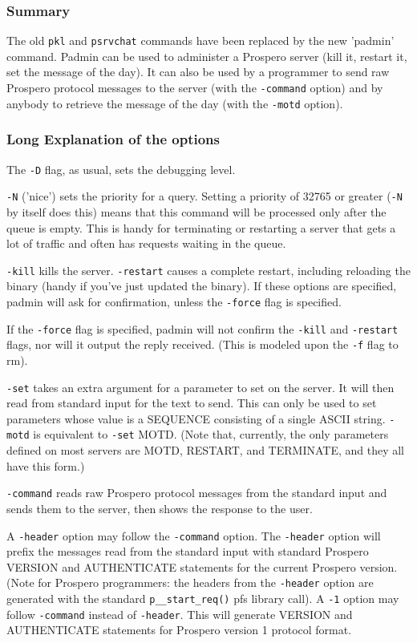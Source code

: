 \subsubsection*{Summary}

The old {\tt pkl} and {\tt psrvchat} commands have been replaced by the new
'padmin' command.  Padmin can be used to administer a Prospero server
(kill it, restart it, set the message of the day).  It can also be
used by a programmer to send raw Prospero protocol messages to the
server (with the {\tt -command} option) and by anybody to retrieve the
message of the day (with the {\tt -motd} option).

\subsubsection*{Long Explanation of the options}

The {\tt -D} flag, as usual, sets the debugging level.

{\tt -N} ('nice') sets the priority for a query.  Setting a priority of
32765 or greater ({\tt -N} by itself does this) means that this command will
be processed only after the queue is empty.  This is handy for
terminating or restarting a server that gets a lot of traffic and
often has requests waiting in the queue.

{\tt -kill} kills the server.  {\tt -restart} causes a complete
restart, including reloading the binary (handy if you've just updated
the binary).  If these options are specified, padmin will ask for
confirmation, unless the {\tt -force} flag is specified.

If the {\tt -force} flag is specified, padmin will not confirm the {\tt -kill} and
{\tt -restart} flags, nor will it output the reply received.  (This is
modeled upon the {\tt -f} flag to rm).

{\tt -set} takes an extra argument for a parameter to set on the server.  It
will then read from standard input for the text to send.  This can
only be used to set parameters whose value is a SEQUENCE consisting of
a single ASCII string.  {\tt -motd} is equivalent to {\tt -set} MOTD.  (Note that,
currently, the only parameters defined on most servers are MOTD,
RESTART, and TERMINATE, and they all have this form.)

{\tt -command} reads raw Prospero protocol messages from the standard input
and sends them to the server, then shows the response to the user.

A {\tt -header} option may follow the {\tt -command} option.  The {\tt -header} option
will prefix the messages read from the standard input with standard
Prospero VERSION and AUTHENTICATE statements for the current Prospero
version.  (Note for Prospero programmers: the headers from the {\tt -header}
option are generated with the standard {\tt p\_\_start\_req()} pfs library
call).  A {\tt -1} option may follow {\tt -command} instead of {\tt -header}.  This will
generate VERSION and AUTHENTICATE statements for Prospero version 1
protocol format.

